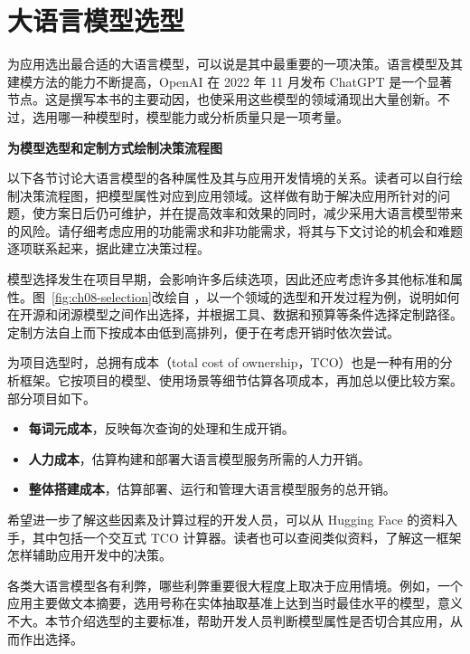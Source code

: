 \section{大语言模型选型}
\label{sec:ch08-selection}
为应用选出最合适的大语言模型，可以说是其中最重要的一项决策。语言模型及其建模方法的能力不断提高，OpenAI 在 2022 年 11 月发布 ChatGPT 是一个显著节点。这是撰写本书的主要动因，也使采用这些模型的领域涌现出大量创新。不过，选用哪一种模型时，模型能力或分析质量只是一项考量。

\begin{keypoint}
\textbf{为模型选型和定制方式绘制决策流程图}

以下各节讨论大语言模型的各种属性及其与应用开发情境的关系。读者可以自行绘制决策流程图，把模型属性对应到应用领域。这样做有助于解决应用所针对的问题，使方案日后仍可维护，并在提高效率和效果的同时，减少采用大语言模型带来的风险。请仔细考虑应用的功能需求和非功能需求，将其与下文讨论的机会和难题逐项联系起来，据此建立决策过程。
\end{keypoint}

模型选择发生在项目早期，会影响许多后续选项，因此还应考虑许多其他标准和属性。图~\ref{fig:ch08-selection}改绘自 ，以一个领域的选型和开发过程为例，说明如何在开源和闭源模型之间作出选择，并根据工具、数据和预算等条件选择定制路径。定制方法自上而下按成本由低到高排列，便于在考虑开销时依次尝试。



\begin{keypoint}
为项目选型时，总拥有成本（total cost of ownership，TCO）也是一种有用的分析框架。它按项目的模型、使用场景等细节估算各项成本，再加总以便比较方案。部分项目如下。
\begin{itemize}
\item \textbf{每词元成本}，反映每次查询的处理和生成开销。
\item \textbf{人力成本}，估算构建和部署大语言模型服务所需的人力开销。
\item \textbf{整体搭建成本}，估算部署、运行和管理大语言模型服务的总开销。
\end{itemize}
希望进一步了解这些因素及计算过程的开发人员，可以从 Hugging Face 的资料入手，其中包括一个交互式 TCO 计算器。读者也可以查阅类似资料，了解这一框架怎样辅助应用开发中的决策。
\end{keypoint}



各类大语言模型各有利弊，哪些利弊重要很大程度上取决于应用情境。例如，一个应用主要做文本摘要，选用号称在实体抽取基准上达到当时最佳水平的模型，意义不大。本节介绍选型的主要标准，帮助开发人员判断模型属性是否切合其应用，从而作出选择。

